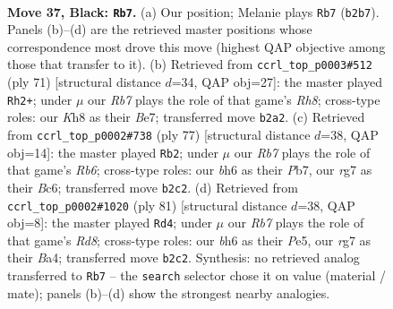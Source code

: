 \documentclass[11pt]{article}
\begin{document}
\clearpage

\begin{figure}[p]\centering
\begin{subfigure}{0.46\textwidth}\centering
\resizebox{\linewidth}{!}{%
\newchessgame
\chessboard[
  setfen={3N3k/6Rp/5ppB/8/5P1P/3P4/PrP2PK1/8 b - - 3 37},
  showmover=false,
  pgfstyle=straightmove, color=movearrow, markmove={b2-b7}
]}
\caption{}
\end{subfigure}\hfill
\begin{subfigure}{0.46\textwidth}\centering
\resizebox{\linewidth}{!}{%
\newchessgame
\chessboard[
  setfen={4k3/4b2p/3R2pP/2B5/4PP2/2P2P2/1PK5/7r b - - 0 36},
  showmover=false,
  pgfstyle=straightmove, color=movearrow, markmove={h1-h2}
]}
\caption{}
\end{subfigure}
\\[4pt]
\begin{subfigure}{0.46\textwidth}\centering
\resizebox{\linewidth}{!}{%
\newchessgame
\chessboard[
  setfen={8/1p3kp1/2bR1p2/2B4p/1P5P/1r2PP2/6PK/8 b - - 6 39},
  showmover=false,
  pgfstyle=straightmove, color=movearrow, markmove={b3-b2}
]}
\caption{}
\end{subfigure}\hfill
\begin{subfigure}{0.46\textwidth}\centering
\resizebox{\linewidth}{!}{%
\newchessgame
\chessboard[
  setfen={6k1/8/8/3Ppp1p/bR3P2/1p4PP/5K2/3r1B2 b - - 0 41},
  showmover=false,
  pgfstyle=straightmove, color=movearrow, markmove={d1-d4}
]}
\caption{}
\end{subfigure}
\caption{\textbf{Move 37, Black: \texttt{Rb7}.} (a) Our position; Melanie plays \texttt{Rb7} (\texttt{b2b7}). Panels (b)--(d) are the retrieved master positions whose correspondence most drove this move (highest QAP objective among those that transfer to it). (b) Retrieved from \texttt{ccrl\_top\_p0003\#512} (ply 71) [structural distance $d$=34, QAP obj=27]: the master played \texttt{Rh2+}; under $\mu$ our \emph{Rb7} plays the role of that game's \emph{Rh8}; cross-type roles: our \emph{K}h8 as their \emph{B}e7; transferred move \texttt{b2a2}. (c) Retrieved from \texttt{ccrl\_top\_p0002\#738} (ply 77) [structural distance $d$=38, QAP obj=14]: the master played \texttt{Rb2}; under $\mu$ our \emph{Rb7} plays the role of that game's \emph{Rb6}; cross-type roles: our \emph{b}h6 as their \emph{P}b7, our \emph{r}g7 as their \emph{B}c6; transferred move \texttt{b2c2}. (d) Retrieved from \texttt{ccrl\_top\_p0002\#1020} (ply 81) [structural distance $d$=38, QAP obj=8]: the master played \texttt{Rd4}; under $\mu$ our \emph{Rb7} plays the role of that game's \emph{Rd8}; cross-type roles: our \emph{b}h6 as their \emph{P}e5, our \emph{r}g7 as their \emph{B}a4; transferred move \texttt{b2c2}. Synthesis: no retrieved analog transferred to \texttt{Rb7} -- the \texttt{search} selector chose it on value (material / mate); panels (b)--(d) show the strongest nearby analogies.}
\label{fig:thought-m73}
\end{figure}
\end{document}
